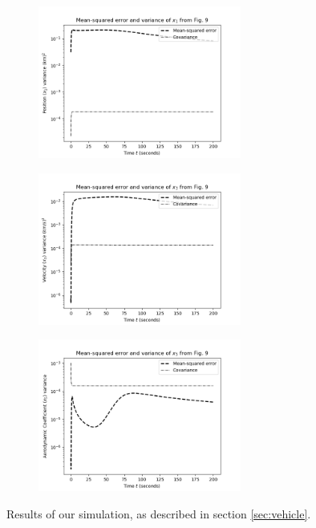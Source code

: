 \documentclass[]{article}
\begin{document}
\begin{figure}[ht]
\centering\noindent
\begin{subfigure}{0.48\textwidth}
    \includegraphics[width=\linewidth, height=5cm]{x1.png}
    \label{fig:results_x1}
\end{subfigure}
\begin{subfigure}{0.48\textwidth}
    \includegraphics[width=\linewidth, height=5cm]{x3.png}
    \label{fig:results_x3}
\end{subfigure}
\begin{subfigure}{0.48\textwidth}
    \includegraphics[width=\linewidth, height=5cm]{x5.png}
    \label{fig:results_x5}
\end{subfigure}
\caption{Results of our simulation, as described in section \ref{sec:vehicle}.}
\label{fig:results}
\end{figure}
\end{document}

